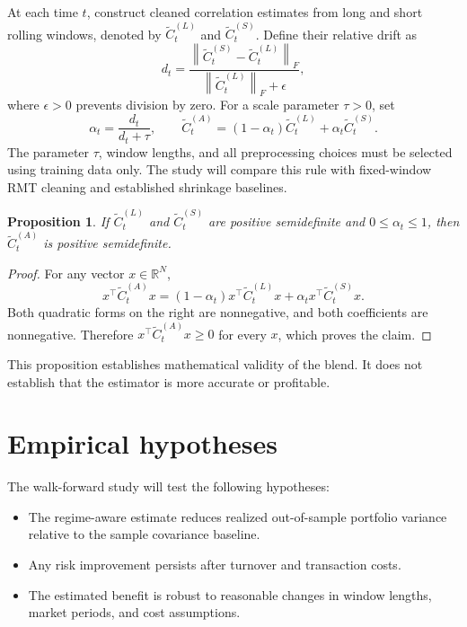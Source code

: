 \documentclass[11pt]{article}
\newtheorem{proposition}{Proposition}
\begin{document}
At each time $t$, construct cleaned correlation estimates from long and short
rolling windows, denoted by $\widetilde{C}^{(L)}_t$ and
$\widetilde{C}^{(S)}_t$. Define their relative drift as
\[
    d_t =
    \frac{
        \left\lVert \widetilde{C}^{(S)}_t -
        \widetilde{C}^{(L)}_t \right\rVert_F
    }{
        \left\lVert \widetilde{C}^{(L)}_t \right\rVert_F + \epsilon
    },
\]
where $\epsilon > 0$ prevents division by zero. For a scale parameter
$\tau > 0$, set
\[
    \alpha_t = \frac{d_t}{d_t+\tau},
    \qquad
    \widetilde{C}^{(A)}_t =
    (1-\alpha_t)\widetilde{C}^{(L)}_t
    + \alpha_t \widetilde{C}^{(S)}_t.
\]
The parameter $\tau$, window lengths, and all preprocessing choices must be
selected using training data only. The study will compare this rule with
fixed-window RMT cleaning and established shrinkage baselines.

\begin{proposition}
If $\widetilde{C}^{(L)}_t$ and $\widetilde{C}^{(S)}_t$ are positive
semidefinite and $0 \leq \alpha_t \leq 1$, then
$\widetilde{C}^{(A)}_t$ is positive semidefinite.
\end{proposition}

\begin{proof}
For any vector $x \in \mathbb{R}^N$,
\[
x^\top \widetilde{C}^{(A)}_t x
=
(1-\alpha_t)x^\top \widetilde{C}^{(L)}_t x
+\alpha_t x^\top \widetilde{C}^{(S)}_t x.
\]
Both quadratic forms on the right are nonnegative, and both coefficients are
nonnegative. Therefore
$x^\top \widetilde{C}^{(A)}_t x \geq 0$ for every $x$, which proves the claim.
\end{proof}

This proposition establishes mathematical validity of the blend. It does not
establish that the estimator is more accurate or profitable.

\section{Empirical hypotheses}

The walk-forward study will test the following hypotheses:

\begin{itemize}
    \item[H1.] The regime-aware estimate reduces realized out-of-sample portfolio
    variance relative to the sample covariance baseline.
    \item[H2.] Any risk improvement persists after turnover and transaction costs.
    \item[H3.] The estimated benefit is robust to reasonable changes in window
    lengths, market periods, and cost assumptions.
\end{itemize}
\end{document}
